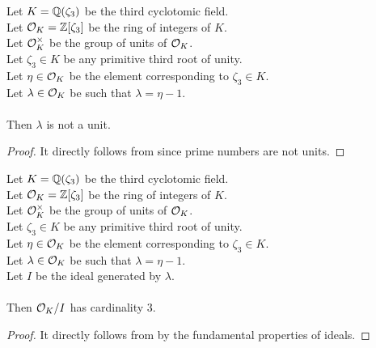\begin{lemma}
    \label{lmm:lambda_not_unit}
    \leanok
    Let $K = \mathbb{Q}(\zeta_3)$ be the third cyclotomic field. \\
    Let $\mathcal{O}_K = \mathbb{Z}[\zeta_3]$ be the ring of integers of $K$. \\
    Let $\mathcal{O}^\times_K$ be the group of units of $\mathcal{O}_K$. \\
    Let $\zeta_3 \in K$ be any primitive third root of unity. \\
    Let $\eta \in \mathcal{O}_K$ be the element corresponding to $\zeta_3 \in K$. \\
    Let $\lambda \in \mathcal{O}_K$ be such that $\lambda = \eta -1$. \\\\
    Then $\lambda$ is not a unit.
\end{lemma}
\begin{proof}
    \leanok
    It directly follows from  since prime numbers are not units.
\end{proof}

\begin{lemma}
    \label{lmm:card_quot}
    \leanok
    Let $K = \mathbb{Q}(\zeta_3)$ be the third cyclotomic field. \\
    Let $\mathcal{O}_K = \mathbb{Z}[\zeta_3]$ be the ring of integers of $K$. \\
    Let $\mathcal{O}^\times_K$ be the group of units of $\mathcal{O}_K$. \\
    Let $\zeta_3 \in K$ be any primitive third root of unity. \\
    Let $\eta \in \mathcal{O}_K$ be the element corresponding to $\zeta_3 \in K$. \\
    Let $\lambda \in \mathcal{O}_K$ be such that $\lambda = \eta -1$. \\
    Let $I$ be the ideal generated by $\lambda$. \\\\
    Then $\mathcal{O}_K / I$ has cardinality $3$.
\end{lemma}
\begin{proof}
    \leanok
    It directly follows from  by the fundamental properties of ideals.
\end{proof}

